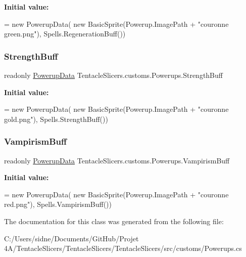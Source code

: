 {\bfseries Initial value\+:}
\begin{DoxyCode}
= \textcolor{keyword}{new} PowerupData(
            \textcolor{keyword}{new} BasicSprite(Powerup.ImagePath + \textcolor{stringliteral}{"couronne green.png"}), Spells.RegenerationBuff())
\end{DoxyCode}
\mbox{\label{class_tentacle_slicers_1_1customs_1_1_powerups_a80f622f485851511f2536cecc2447cc7}} 
\subsubsection{\texorpdfstring{Strength\+Buff}{StrengthBuff}}
{\footnotesize\ttfamily readonly \hyperlink{class_tentacle_slicers_1_1actors_1_1_powerup_data}{Powerup\+Data} Tentacle\+Slicers.\+customs.\+Powerups.\+Strength\+Buff\hspace{0.3cm}{\ttfamily [static]}}

{\bfseries Initial value\+:}
\begin{DoxyCode}
= \textcolor{keyword}{new} PowerupData(
            \textcolor{keyword}{new} BasicSprite(Powerup.ImagePath + \textcolor{stringliteral}{"couronne gold.png"}), Spells.StrengthBuff())
\end{DoxyCode}
\mbox{\label{class_tentacle_slicers_1_1customs_1_1_powerups_a01cecbe753baf7b28bda650ac5f8c432}} 
\subsubsection{\texorpdfstring{Vampirism\+Buff}{VampirismBuff}}
{\footnotesize\ttfamily readonly \hyperlink{class_tentacle_slicers_1_1actors_1_1_powerup_data}{Powerup\+Data} Tentacle\+Slicers.\+customs.\+Powerups.\+Vampirism\+Buff\hspace{0.3cm}{\ttfamily [static]}}

{\bfseries Initial value\+:}
\begin{DoxyCode}
= \textcolor{keyword}{new} PowerupData(
            \textcolor{keyword}{new} BasicSprite(Powerup.ImagePath + \textcolor{stringliteral}{"couronne red.png"}), Spells.VampirismBuff())
\end{DoxyCode}


The documentation for this class was generated from the following file\+:\begin{DoxyCompactItemize}
\item 
C\+:/\+Users/sidne/\+Documents/\+Git\+Hub/\+Projet 4\+A/\+Tentacle\+Slicers/\+Tentacle\+Slicers/\+Tentacle\+Slicers/src/customs/Powerups.\+cs\end{DoxyCompactItemize}
